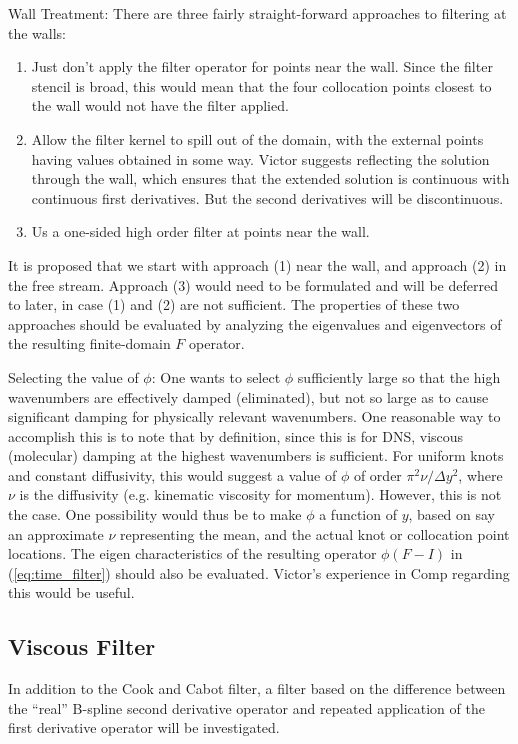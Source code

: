 Wall Treatment: There are three fairly straight-forward
approaches to filtering at the walls:
\begin{enumerate}
\item Just don't apply the filter operator for points near the
      wall. Since the filter stencil is broad, this would mean that the
      four collocation points closest to the wall would not have the
      filter applied.
\item Allow the filter kernel to spill out of the domain, with the
      external points having values obtained in some way. Victor
      suggests reflecting the solution through the wall, which ensures
      that the extended solution is continuous with continuous first
      derivatives. But the second derivatives will be discontinuous.
\item Us a one-sided high order filter at points near the wall.
\end{enumerate}
It is proposed that we start with approach (1) near the wall, and
approach (2) in the free stream. Approach (3) would need to be
formulated and will be deferred to later, in case (1) and (2)  are not
sufficient. The properties of these two approaches should be evaluated
by analyzing the eigenvalues and eigenvectors of the resulting
finite-domain $F$ operator.

Selecting the value of $\phi$:
One wants to select $\phi$ sufficiently large so that the high
wavenumbers are effectively damped (eliminated), but not so large as to
cause significant damping for physically relevant wavenumbers. One
reasonable way to accomplish this is to note that by definition, since
this is for DNS, viscous (molecular) damping at the highest wavenumbers
is sufficient. For uniform knots and constant diffusivity, this would
suggest a value of $\phi$ of order $\pi^2\nu/\Delta y^2$, where $\nu$ is
the diffusivity (e.g. kinematic viscosity for momentum). However, this
is not the case. One possibility would thus be to make $\phi$ a function
of $y$, based on say an approximate $\nu$ representing the mean, and the
actual knot or collocation point locations. The eigen characteristics of
the resulting operator $\phi(F-I)$ in (\ref{eq:time_filter}) should also
be evaluated. Victor's experience in Comp regarding this would be useful.

\subsection{Viscous Filter}
In addition to the Cook and Cabot filter, a filter based on the
difference between the ``real'' B-spline second derivative operator
and repeated application of the first derivative operator will be
investigated.



%
